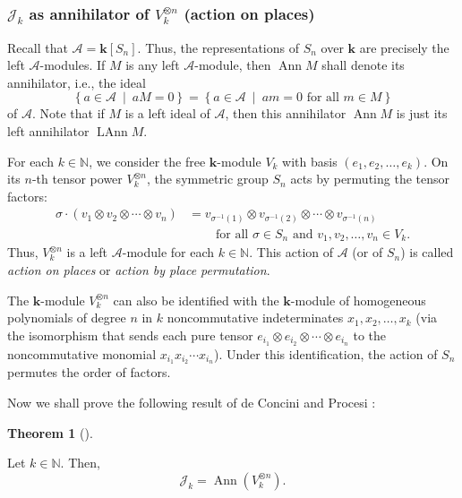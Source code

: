 \documentclass[numbers=enddot,12pt,final,onecolumn,notitlepage]{scrartcl}%
\numberwithin{exer}{subsection}
\theoremstyle{definition}
\newtheorem{theo}{Theorem}[subsection]
\newenvironment{theorem}[1][]
{\begin{theo}[#1]\begin{leftbar}}
{\end{leftbar}\end{theo}}
\begin{document}
\subsubsection{$\mathcal{J}_{k}$ as annihilator of $V_{k}^{\otimes n}$ (action
on places)}

Recall that $\mathcal{A}=\mathbf{k}\left[  S_{n}\right]  $. Thus, the
representations of $S_{n}$ over $\mathbf{k}$ are precisely the left
$\mathcal{A}$-modules. If $M$ is any left $\mathcal{A}$-module, then
$\operatorname*{Ann}M$ shall denote its annihilator, i.e., the ideal
\[
\left\{  a\in\mathcal{A}\ \mid\ aM=0\right\}  =\left\{  a\in\mathcal{A}%
\ \mid\ am=0\text{ for all }m\in M\right\}
\]
of $\mathcal{A}$. Note that if $M$ is a left ideal of $\mathcal{A}$, then this
annihilator $\operatorname*{Ann}M$ is just its left annihilator
$\operatorname*{LAnn}M$.

For each $k\in\mathbb{N}$, we consider the free $\mathbf{k}$-module $V_{k}$
with basis $\left(  e_{1},e_{2},\ldots,e_{k}\right)  $. On its $n$-th tensor
power $V_{k}^{\otimes n}$, the symmetric group $S_{n}$ acts by permuting the
tensor factors:%
\begin{align*}
\sigma\cdot\left(  v_{1}\otimes v_{2}\otimes\cdots\otimes v_{n}\right)   &
=v_{\sigma^{-1}\left(  1\right)  }\otimes v_{\sigma^{-1}\left(  2\right)
}\otimes\cdots\otimes v_{\sigma^{-1}\left(  n\right)  }\\
&  \ \ \ \ \ \ \ \ \ \ \text{for all }\sigma\in S_{n}\text{ and }v_{1}%
,v_{2},\ldots,v_{n}\in V_{k}.
\end{align*}
Thus, $V_{k}^{\otimes n}$ is a left $\mathcal{A}$-module for each
$k\in\mathbb{N}$. This action of $\mathcal{A}$ (or of $S_{n}$) is called
\emph{action on places} or \emph{action by place permutation}.

The $\mathbf{k}$-module $V_{k}^{\otimes n}$ can also be identified with the
$\mathbf{k}$-module of homogeneous polynomials of degree $n$ in $k$
noncommutative indeterminates $x_{1},x_{2},\ldots,x_{k}$ (via the isomorphism
that sends each pure tensor $e_{i_{1}}\otimes e_{i_{2}}\otimes\cdots\otimes
e_{i_{n}}$ to the noncommutative monomial $x_{i_{1}}x_{i_{2}}\cdots x_{i_{n}}%
$). Under this identification, the action of $S_{n}$ permutes the order of factors.

Now we shall prove the following result of de Concini and Procesi
\cite[Theorem 4.2]{deCPro76}:


\begin{theorem}
\label{thm.AnnVkn}Let $k\in\mathbb{N}$. Then,%
\[
\mathcal{J}_{k}=\operatorname*{Ann}\left(  V_{k}^{\otimes n}\right)  .
\]

\end{theorem}
\end{document}
